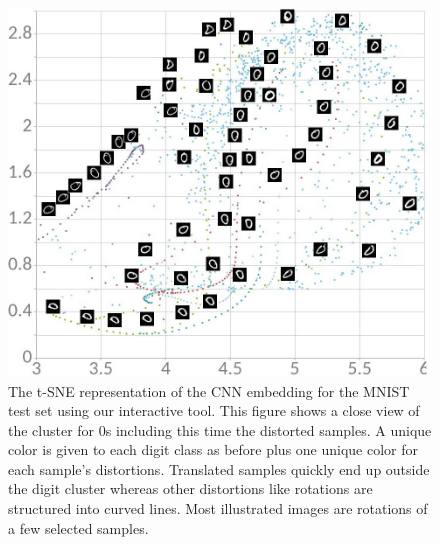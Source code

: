 \documentclass[a4paper,12pt]{report}
\begin{document}
\begin{figure}[t]
    \centering
    \includegraphics[width=\textwidth]{thesis_figures/mnist_nda_tsne2.jpg}
    \caption{The t-SNE representation of the CNN embedding for the MNIST test set using our interactive tool.
    This figure shows a close view of the cluster for 0s including this time the distorted samples.
    A unique color is given to each digit class as before plus one unique color for each sample's distortions.
    Translated samples quickly end up outside the digit cluster whereas other distortions like rotations are structured into curved lines.
    Most illustrated images are rotations of a few selected samples.
    }
    \label{fig:mnist_nda_tsne2}
\end{figure}
\end{document}
